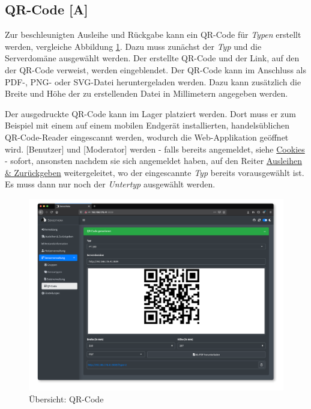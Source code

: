 \documentclass[
]{article}
\begin{document}
\hypertarget{qrcode}{%
\subsection{QR-Code {[}A{]}}\label{qrcode}}

Zur beschleunigten Ausleihe und Rückgabe kann ein QR-Code für \emph{Typen} erstellt werden, vergleiche Abbildung \ref{fig:qr-code-overview}. Dazu muss zunächst der \emph{Typ} und die Serverdomäne ausgewählt werden. Der erstellte QR-Code und der Link, auf den der QR-Code verweist, werden eingeblendet. Der QR-Code kann im Anschluss als PDF-, PNG- oder SVG-Datei heruntergeladen werden. Dazu kann zusätzlich die Breite und Höhe der zu erstellenden Datei in Millimetern angegeben werden.

Der ausgedruckte QR-Code kann im Lager platziert werden. Dort muss er zum Beispiel mit einem auf einem mobilen Endgerät installierten, handelsüblichen QR-Code-Reader eingescannt werden, wodurch die Web-Applikation geöffnet wird. {[}Benutzer{]} und {[}Moderator{]} werden - falls bereits angemeldet, siehe \protect\hyperlink{cookies}{Cookies} - sofort, ansonsten nachdem sie sich angemeldet haben, auf den Reiter \protect\hyperlink{operate}{Ausleihen \& Zurückgeben} weitergeleitet, wo der eingescannte \emph{Typ} bereits vorausgewählt ist. Es muss dann nur noch der \emph{Untertyp} ausgewählt werden.

\begin{figure}
\centering
\includegraphics{./img/qr_code_overview.png}
\caption{\label{fig:qr-code-overview}Übersicht: QR-Code}
\end{figure}
\end{document}
